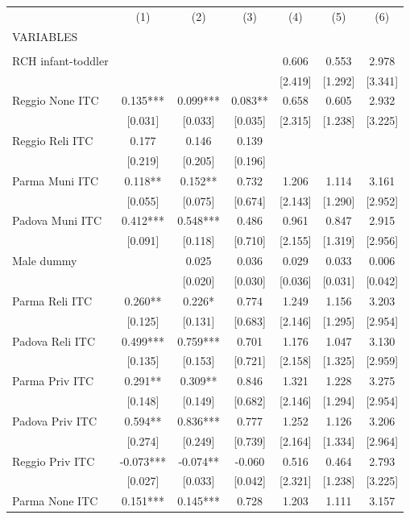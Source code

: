 \begin{tabular}{lcccccc} \hline
 & (1) & (2) & (3) & (4) & (5) & (6) \\
VARIABLES &  &  &  &  &  &  \\ \hline
 &  &  &  &  &  &  \\
RCH infant-toddler &  &  &  & 0.606 & 0.553 & 2.978 \\
 &  &  &  & [2.419] & [1.292] & [3.341] \\
Reggio None ITC & 0.135*** & 0.099*** & 0.083** & 0.658 & 0.605 & 2.932 \\
 & [0.031] & [0.033] & [0.035] & [2.315] & [1.238] & [3.225] \\
Reggio Reli ITC & 0.177 & 0.146 & 0.139 &  &  &  \\
 & [0.219] & [0.205] & [0.196] &  &  &  \\
Parma Muni ITC & 0.118** & 0.152** & 0.732 & 1.206 & 1.114 & 3.161 \\
 & [0.055] & [0.075] & [0.674] & [2.143] & [1.290] & [2.952] \\
Padova Muni ITC & 0.412*** & 0.548*** & 0.486 & 0.961 & 0.847 & 2.915 \\
 & [0.091] & [0.118] & [0.710] & [2.155] & [1.319] & [2.956] \\
Male dummy &  & 0.025 & 0.036 & 0.029 & 0.033 & 0.006 \\
 &  & [0.020] & [0.030] & [0.036] & [0.031] & [0.042] \\
Parma Reli ITC & 0.260** & 0.226* & 0.774 & 1.249 & 1.156 & 3.203 \\
 & [0.125] & [0.131] & [0.683] & [2.146] & [1.295] & [2.954] \\
Padova Reli ITC & 0.499*** & 0.759*** & 0.701 & 1.176 & 1.047 & 3.130 \\
 & [0.135] & [0.153] & [0.721] & [2.158] & [1.325] & [2.959] \\
Parma Priv ITC & 0.291** & 0.309** & 0.846 & 1.321 & 1.228 & 3.275 \\
 & [0.148] & [0.149] & [0.682] & [2.146] & [1.294] & [2.954] \\
Padova Priv ITC & 0.594** & 0.836*** & 0.777 & 1.252 & 1.126 & 3.206 \\
 & [0.274] & [0.249] & [0.739] & [2.164] & [1.334] & [2.964] \\
Reggio Priv ITC & -0.073*** & -0.074** & -0.060 & 0.516 & 0.464 & 2.793 \\
 & [0.027] & [0.033] & [0.042] & [2.321] & [1.238] & [3.225] \\
Parma None ITC & 0.151*** & 0.145*** & 0.728 & 1.203 & 1.111 & 3.157 \\

\end{tabular}
